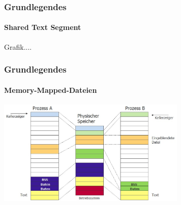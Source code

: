 \documentclass[ddcfooter]{tudbeamer}
\begin{document}
\begin{frame}
%	

\end{frame}

\begin{frame} 
    \frametitle{Grundlegendes}
    \framesubtitle{Shared Text Segment}
    
    Grafik....
    
    
    
    
\end{frame}

\begin{frame} 
    \frametitle{Grundlegendes}
    \framesubtitle{Memory-Mapped-Dateien}
    
    \includegraphics[width=9cm]{segmente.eps}
    
    
    
    
\end{frame}
\end{document}
